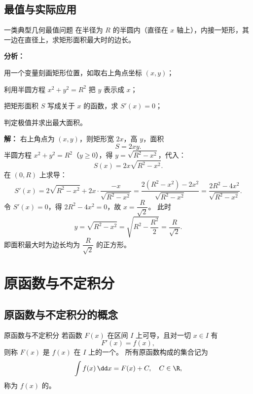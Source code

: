\documentclass[a4paper,11pt]{ctexart}
\begin{document}
\subsection{最值与实际应用}

\begin{examplebox}{一类典型几何最值问题}
在半径为 $R$ 的半圆内（直径在 $x$ 轴上），内接一矩形，其一边在直径上，求矩形面积最大时的边长。

\textbf{分析：}
\begin{focuspoints}
  \item 用一个变量刻画矩形位置，如取右上角点坐标 $(x,y)$；
  \item 利用半圆方程 $x^2+y^2=R^2$ 把 $y$ 表示成 $x$；
  \item 把矩形面积 $S$ 写成关于 $x$ 的函数，求 $S'(x)=0$；
  \item 判定极值并求出最大面积。
\end{focuspoints}

\textbf{解：}
右上角点为 $(x,y)$，则矩形宽 $2x$，高 $y$，面积
\[
  S=2xy.
\]
半圆方程 $x^2+y^2=R^2$（$y\ge 0$），得 $y=\sqrt{R^2-x^2}$，代入：
\[
  S(x)=2x\sqrt{R^2-x^2}.
\]
在 $(0,R)$ 上求导：
\[
  S'(x)=2\sqrt{R^2-x^2}+2x\cdot\dfrac{-x}{\sqrt{R^2-x^2}}
  =\dfrac{2(R^2-x^2)-2x^2}{\sqrt{R^2-x^2}}
  =\dfrac{2R^2-4x^2}{\sqrt{R^2-x^2}}.
\]
令 $S'(x)=0$，得 $2R^2-4x^2=0$，故 $x=\dfrac{R}{\sqrt{2}}$。
此时
\[
  y=\sqrt{R^2-x^2}=\sqrt{R^2-\dfrac{R^2}{2}}=\dfrac{R}{\sqrt{2}}.
\]
即面积最大时为边长均为 $\dfrac{R}{\sqrt{2}}$ 的正方形。
\end{examplebox}

\section{原函数与不定积分}

\subsection{原函数与不定积分的概念}

\begin{definitionbox}{原函数与不定积分}
若函数 $F(x)$ 在区间 $I$ 上可导，且对一切 $x\in I$ 有
\[
  F'(x)=f(x),
\]
则称 $F(x)$ 是 $f(x)$ 在 $I$ 上的一个。
所有原函数构成的集合记为
\[
  \int f(x)\,\dd x = F(x)+C,\quad C\in\R,
\]
称为 $f(x)$ 的。
\end{definitionbox}
\end{document}
